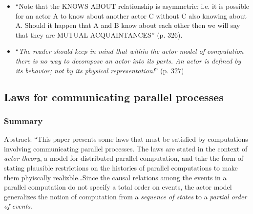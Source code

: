 \begin{itemize}
\begin{itemize}
	\end{itemize}
\item ``Note that the KNOWS ABOUT relationship is asymmetric; i.e. it is possible for an actor A to know about another actor C without C also knowing about A. Should it happen that A and B know about each other then we will say that they are MUTUAL ACQUAINTANCES'' (p. 326).
\item ``\emph{The reader should keep in mind that within the actor model of computation there is no way to decompose an actor into its parts. An actor is defined by its behavior; not by its physical representation!}'' (p. 327)
\end{itemize}

\subsection{Laws for communicating parallel processes}
\subsubsection*{Summary}
Abstract: ``This paper presents some laws that must be satisfied by computations involving communicating parallel processes. The laws are stated in the context of \emph{actor theory}, a model for distributed parallel computation, and take the form of stating plausible restrictions on the histories of parallel computations to make them phyiscally realizble{\ldots}Since the causal relations among the events in a parallel computation do not specify a total order on events, the actor model generalizes the notion of computation from a \emph{sequence of states} to a \emph{partial order of events}.
